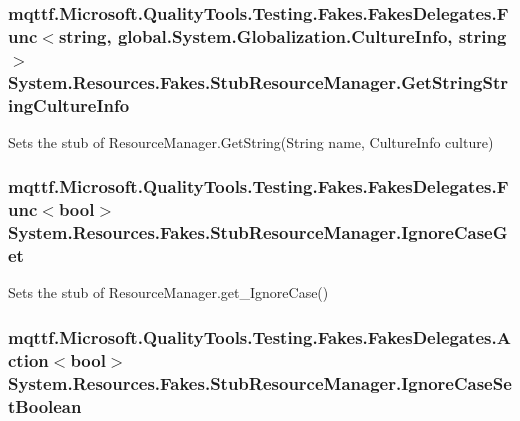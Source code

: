 \hypertarget{class_system_1_1_resources_1_1_fakes_1_1_stub_resource_manager_a206981c7f870aa7a061dea40aa6bbab5}{
\subsubsection[{Get\-String\-String\-Culture\-Info}]{\setlength{\rightskip}{0pt plus 5cm}mqttf.\-Microsoft.\-Quality\-Tools.\-Testing.\-Fakes.\-Fakes\-Delegates.\-Func$<$string, global.\-System.\-Globalization.\-Culture\-Info, string$>$ System.\-Resources.\-Fakes.\-Stub\-Resource\-Manager.\-Get\-String\-String\-Culture\-Info}}\label{class_system_1_1_resources_1_1_fakes_1_1_stub_resource_manager_a206981c7f870aa7a061dea40aa6bbab5}


Sets the stub of Resource\-Manager.\-Get\-String(\-String name, Culture\-Info culture)

\hypertarget{class_system_1_1_resources_1_1_fakes_1_1_stub_resource_manager_a782b3de3fc3db31520aecc988d612305}{
\subsubsection[{Ignore\-Case\-Get}]{\setlength{\rightskip}{0pt plus 5cm}mqttf.\-Microsoft.\-Quality\-Tools.\-Testing.\-Fakes.\-Fakes\-Delegates.\-Func$<$bool$>$ System.\-Resources.\-Fakes.\-Stub\-Resource\-Manager.\-Ignore\-Case\-Get}}\label{class_system_1_1_resources_1_1_fakes_1_1_stub_resource_manager_a782b3de3fc3db31520aecc988d612305}


Sets the stub of Resource\-Manager.\-get\-\_\-\-Ignore\-Case()

\hypertarget{class_system_1_1_resources_1_1_fakes_1_1_stub_resource_manager_a1ca726094e68db9a5b9be5f9da604286}{
\subsubsection[{Ignore\-Case\-Set\-Boolean}]{\setlength{\rightskip}{0pt plus 5cm}mqttf.\-Microsoft.\-Quality\-Tools.\-Testing.\-Fakes.\-Fakes\-Delegates.\-Action$<$bool$>$ System.\-Resources.\-Fakes.\-Stub\-Resource\-Manager.\-Ignore\-Case\-Set\-Boolean}}\label{class_system_1_1_resources_1_1_fakes_1_1_stub_resource_manager_a1ca726094e68db9a5b9be5f9da604286}


